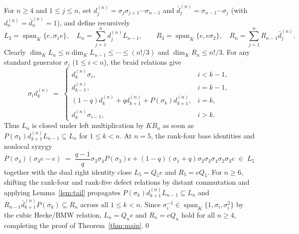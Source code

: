 \documentclass[10pt,reqno]{amsart}
\theoremstyle{definition}
\begin{document}
For $n\ge 4$ and $1\le j\le n$, set $d_j^{(n)}=\sigma_j\sigma_{j+1}\cdots\sigma_{n-1}$ and $\bar{d}_j^{(n)}=\sigma_{n-1}\cdots\sigma_j$ (with $d_n^{(n)}=\bar{d}_n^{(n)}=1$), and define recursively
\[
  L_3 = \operatorname{span}_K\{e,\sigma_1 e\},\quad L_n = \sum_{j=1}^n d_j^{(n)} L_{n-1},
  \qquad
  R_3 = \operatorname{span}_K\{e,e\sigma_2\},\quad R_n = \sum_{j=1}^n R_{n-1}\bar{d}_j^{(n)}.
\]
Clearly $\dim_K L_n \le n \dim_K L_{n-1} \le \cdots \le (n!/3)$ and $\dim_K R_n \le n!/3$. For any standard generator $\sigma_i$ ($1\le i<n$), the braid relations give
\[
  \sigma_i d_k^{(n)} \;=\;
  \begin{cases}
    d_k^{(n)}\sigma_i, & i < k-1, \\
    d_{k-1}^{(n)}, & i = k-1, \\
    (1-q)d_k^{(n)} + q d_{k+1}^{(n)} + P(\sigma_k)d_{k+1}^{(n)}, & i = k, \\
    d_k^{(n)}\sigma_{i-1}, & i > k.
  \end{cases}
\]
Thus $L_n$ is closed under left multiplication by $K B_n$ as soon as $P(\sigma_k)d_{k+1}^{(n)} L_{n-1}\subseteq L_n$ for $1\le k<n$. At $n=5$, the rank-four base identities and nonlocal syzygy
\[
  P(\sigma_4)(\sigma_3 e - e) \;=\; \frac{q-1}{q}\sigma_3\sigma_4 P(\sigma_3)e + (1-q)(\sigma_1+q)\sigma_2\sigma_3\sigma_4\sigma_2\sigma_3 e \;\in\; L_5
\]
together with the dual right identity close $L_5=Q_5 e$ and $R_5=e Q_5$. For $n\ge 6$, shifting the rank-four and rank-five defect relations by distant commutation and applying Lemma~\ref{lem:tail} propagates $P(\sigma_k)d_{k+1}^{(n)} L_{n-1}\subseteq L_n$ and $R_{n-1}\bar{d}_{k+1}^{(n)} P(\sigma_k)\subseteq R_n$ across all $1\le k<n$. Since $\sigma_i^{-1}\in\operatorname{span}_K\{1,\sigma_i,\sigma_i^2\}$ by the cubic Hecke/BMW relation, $L_n=Q_n e$ and $R_n=e Q_n$ hold for all $n\ge 4$, completing the proof of Theorem~\ref{thm:main}.\qed
\end{document}
